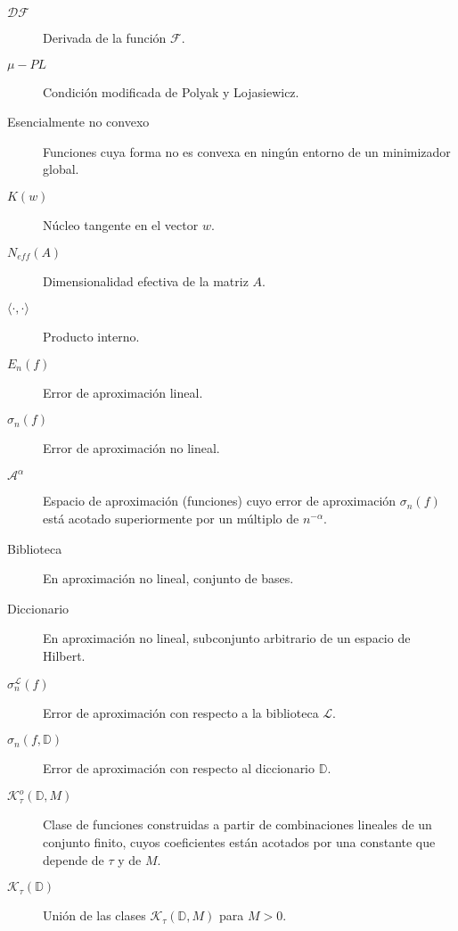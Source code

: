 \begin{description}
  \item[$\mathcal{DF}$] Derivada de la función $\mathcal{F}$.
  \item[$\mu-PL$] Condición modificada de Polyak y Lojasiewicz.
  \item[Esencialmente no convexo] Funciones cuya forma no es convexa en ningún entorno de un minimizador global.
  \item[$K(w)$] Núcleo tangente en el vector $w$.
  \item[$N_{eff}(A)$] Dimensionalidad efectiva de la matriz $A$.
  \item[$\langle \cdot, \cdot \rangle$] Producto interno.
  \item[$E_n(f)$] Error de aproximación lineal.
  \item[$\sigma_n(f)$] Error de aproximación no lineal.
  \item[$\mathcal{A}^{\alpha}$] Espacio de aproximación (funciones) cuyo error de aproximación $\sigma_n(f)$ está acotado superiormente por un múltiplo de $n^{-\alpha}$.
  \item[Biblioteca] En aproximación no lineal, conjunto de bases.
  \item[Diccionario] En aproximación no lineal, subconjunto arbitrario de un espacio de Hilbert.
  \item[$\sigma_n^{\mathcal{L}}(f)$] Error de aproximación con respecto a la biblioteca $\mathcal{L}$.
  \item[$\sigma_n(f, \mathbb{D})$] Error de aproximación con respecto al diccionario $\mathbb{D}$.
  \item[$\mathcal{K}_{\tau}^{o}(\mathbb{D}, M)$] Clase de funciones construidas a partir de combinaciones lineales de un conjunto finito, cuyos coeficientes están acotados por una constante que depende de $\tau$ y de $M$.
  \item[$\mathcal{K}_{\tau}(\mathbb{D})$] Unión de las clases $\mathcal{K}_{\tau}(\mathbb{D}, M)$ para $M > 0$.
\end{description}
\endinput

